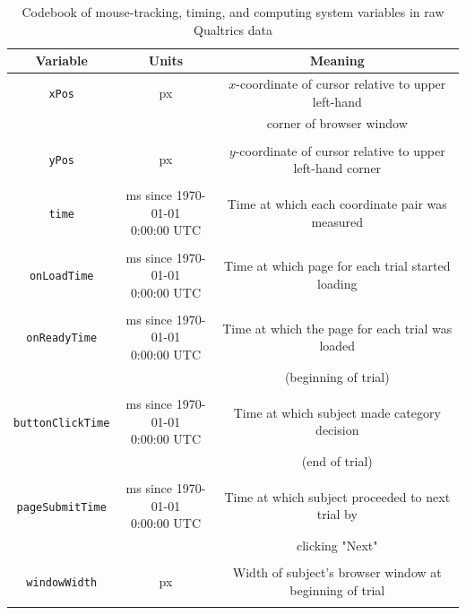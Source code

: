 \documentclass[]{article}
\begin{document}
\begin{table}[H]
\caption{Codebook of mouse-tracking, timing, and computing system variables in raw Qualtrics data}
\label{tb:wide_codebook}
\centering
\begin{tabular}{@{}ccc@{}}
\toprule
\textbf{Variable}             & \textbf{Units}      & \textbf{Meaning}                                      \\ \midrule
\texttt{xPos}              & px & $x$-coordinate of cursor relative to upper left-hand \\&&corner of browser window \\ \\
\texttt{yPos}              & px & $y$-coordinate of cursor relative to upper left-hand corner \\ \\
\texttt{time}              & \makecell{ms since 1970-01-01 \\0:00:00 UTC} & Time at which each coordinate pair was measured  \\ \\
\texttt{onLoadTime}         & \makecell{ms since 1970-01-01 \\0:00:00 UTC}    &  Time at which page for each trial started loading                         \\ \\
\texttt{onReadyTime}               & \makecell{ms since 1970-01-01 \\0:00:00 UTC} & Time at which the page for each trial was loaded \\&&(beginning of trial)                              \\ \\
\texttt{buttonClickTime}       & \makecell{ms since 1970-01-01 \\0:00:00 UTC}    & Time at which subject made category decision \\&&(end of trial)                                                                   \\ \\
\texttt{pageSubmitTime}              & \makecell{ms since 1970-01-01 \\0:00:00 UTC} & Time at which subject proceeded to next trial by \\&&clicking "Next" \\ \\
\texttt{windowWidth}              & px & Width of subject's browser window at beginning of trial\\ \\

\end{tabular}
\end{table}
\end{document}
